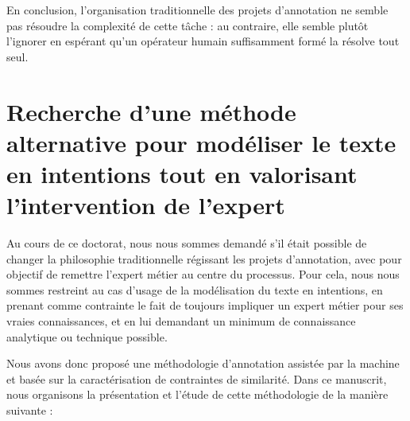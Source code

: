 		En conclusion, l'organisation traditionnelle des projets d'annotation ne semble pas résoudre la complexité de cette tâche : au contraire, elle semble plutôt l'ignorer en espérant qu'un opérateur humain suffisamment formé la résolve tout seul.
		
		
	\section*{Recherche d'une méthode alternative pour modéliser le texte en intentions tout en valorisant l'intervention de l'expert}
		
		Au cours de ce doctorat, nous nous sommes demandé s'il était possible de changer la philosophie traditionnelle régissant les projets d'annotation, avec pour objectif de remettre l'expert métier au centre du processus.
		Pour cela, nous nous sommes restreint au cas d'usage de la modélisation du texte en intentions, en prenant comme contrainte le fait de toujours impliquer un expert métier pour ses vraies connaissances, et en lui demandant un minimum de connaissance analytique ou technique possible.
		
		Nous avons donc proposé une méthodologie d'annotation assistée par la machine et basée sur la caractérisation de contraintes de similarité.
		Dans ce manuscrit, nous organisons la présentation et l'étude de cette méthodologie de la manière suivante :
		
